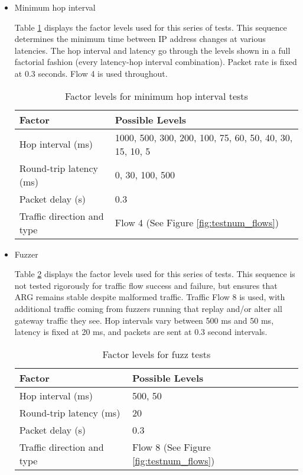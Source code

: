\begin{itemize}
	\item Minimum hop interval 
	\par Table \ref{tbl:hoprate_factors} displays the factor levels used for this series of tests. This sequence determines the minimum time between \ac{IP} address changes at various latencies. The hop interval and latency go through the levels shown in a full factorial fashion (every latency-hop interval combination). Packet rate is fixed at 0.3 seconds. Flow 4 is used throughout.

\begin{table}
\caption{Factor levels for minimum hop interval tests}
\label{tbl:hoprate_factors}
\centering
\begin{tabular}{ll}
\toprule
\textbf{Factor} & \textbf{Possible Levels} \\
\hline
Hop interval (ms) & 1000, 500, 300, 200, 100, 75, 60, 50, 40, 30, 15, 10, 5\\
Round-trip latency (ms) & 0, 30, 100, 500\\
Packet delay (s) & 0.3\\
Traffic direction and type & Flow 4 (See Figure \ref{fig:testnum_flows})\\
\bottomrule
\end{tabular}
\end{table}

	\item Fuzzer
	\par Table \ref{tbl:fuzz_factors} displays the factor levels used for this series of tests. This sequence is not tested rigorously for traffic flow success and failure, but ensures that \ac{ARG} remains stable despite malformed traffic. Traffic Flow 8 is used, with additional traffic coming from fuzzers running that replay and/or alter all gateway traffic they see. Hop intervals vary between 500 ms and 50 ms, latency is fixed at 20 ms, and packets are sent at 0.3 second intervals.

\begin{table}
\caption{Factor levels for fuzz tests}
\label{tbl:fuzz_factors}
\centering
\begin{tabular}{ll}
\toprule
\textbf{Factor} & \textbf{Possible Levels} \\
\hline
Hop interval (ms) & 500, 50\\
Round-trip latency (ms) & 20\\
Packet delay (s) & 0.3\\
Traffic direction and type & Flow 8 (See Figure \ref{fig:testnum_flows})\\
\bottomrule
\end{tabular}
\end{table}
\end{itemize}

